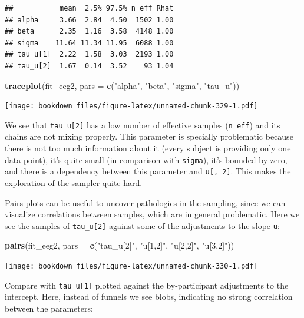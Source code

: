 \documentclass[12pt,]{krantz}
\newenvironment{Shaded}{\begin{snugshade}}{\end{snugshade}}
\newcommand{\KeywordTok}[1]{\textcolor[rgb]{0.13,0.29,0.53}{\textbf{#1}}}
\newcommand{\DataTypeTok}[1]{\textcolor[rgb]{0.13,0.29,0.53}{#1}}
\newcommand{\StringTok}[1]{\textcolor[rgb]{0.31,0.60,0.02}{#1}}
\newcommand{\NormalTok}[1]{#1}
\theoremstyle{definition}
\theoremstyle{definition}
\theoremstyle{definition}
\theoremstyle{remark}
\begin{document}
\begin{verbatim}
##           mean  2.5% 97.5% n_eff Rhat
## alpha     3.66  2.84  4.50  1502 1.00
## beta      2.35  1.16  3.58  4148 1.00
## sigma    11.64 11.34 11.95  6088 1.00
## tau_u[1]  2.22  1.58  3.03  2193 1.00
## tau_u[2]  1.67  0.14  3.52    93 1.04
\end{verbatim}

\begin{Shaded}
\begin{Highlighting}[]
\KeywordTok{traceplot}\NormalTok{(fit_eeg2, }\DataTypeTok{pars =} \KeywordTok{c}\NormalTok{(}\StringTok{"alpha"}\NormalTok{, }\StringTok{"beta"}\NormalTok{, }\StringTok{"sigma"}\NormalTok{, }\StringTok{"tau_u"}\NormalTok{))}
\end{Highlighting}
\end{Shaded}

\texttt{[image: bookdown\_files/figure-latex/unnamed-chunk-329-1.pdf]}

We see that \texttt{tau\_u{[}2{]}} has a low number of effective samples
(\texttt{n\_eff}) and its chains are not mixing properly. This parameter
is specially problematic because there is not too much information about
it (every subject is providing only one data point), it's quite small
(in comparison with \texttt{sigma}), it's bounded by zero, and there is
a dependency between this parameter and \texttt{u{[},\ 2{]}}. This makes
the exploration of the sampler quite hard.

Pairs plots can be useful to uncover pathologies in the sampling, since
we can visualize correlations between samples, which are in general
problematic. Here we see the samples of \texttt{tau\_u{[}2{]}} against
some of the adjustments to the slope \texttt{u}:

\begin{Shaded}
\begin{Highlighting}[]
\KeywordTok{pairs}\NormalTok{(fit_eeg2, }\DataTypeTok{pars =} \KeywordTok{c}\NormalTok{(}\StringTok{"tau_u[2]"}\NormalTok{, }\StringTok{"u[1,2]"}\NormalTok{, }\StringTok{"u[2,2]"}\NormalTok{, }\StringTok{"u[3,2]"}\NormalTok{))}
\end{Highlighting}
\end{Shaded}

\texttt{[image: bookdown\_files/figure-latex/unnamed-chunk-330-1.pdf]}

Compare with \texttt{tau\_u{[}1{]}} plotted against the by-participant
adjustments to the intercept. Here, instead of funnels we see blobs,
indicating no strong correlation between the parameters:
\end{document}
